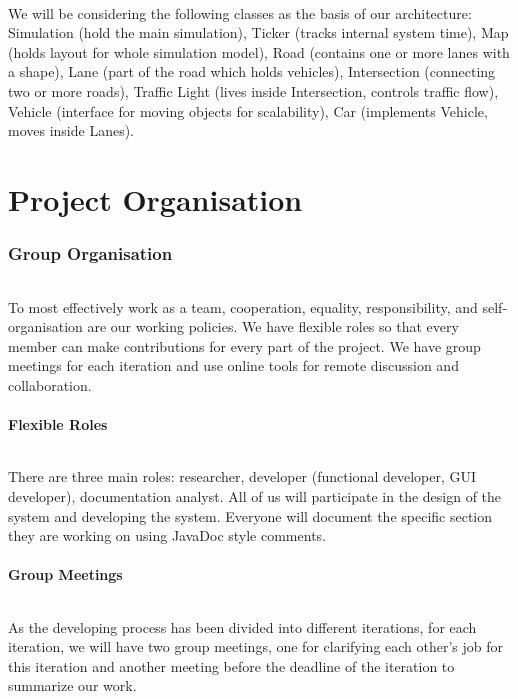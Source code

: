 \documentclass[11pt, a4paper]{article}
\begin{document}
\paragraph{}
We will be considering the following classes as the basis of our architecture: Simulation (hold the main simulation), Ticker (tracks internal system time), Map (holds layout for whole simulation model), Road (contains one or more lanes with a shape), Lane (part of the road which holds vehicles), Intersection (connecting two or more roads), Traffic Light (lives inside Intersection, controls traffic flow), Vehicle (interface for moving objects for scalability), Car (implements Vehicle, moves inside Lanes). 

\part*{Project Organisation}
\section{Group Organisation}
\paragraph{}
To most effectively work as a team, cooperation, equality, responsibility, and self-organisation are our working policies. We have flexible roles so that every member can make contributions for every part of the project. We have group meetings for each iteration and use online tools for remote discussion and collaboration.
\subsection{Flexible Roles}
\paragraph{}
There are three main roles: researcher, developer (functional developer, GUI developer), documentation analyst. All of us will participate in the design of the system and developing the system. Everyone will document the specific section they are working on using JavaDoc style comments.
\subsection{Group Meetings}
\paragraph{}
As the developing process has been divided into different iterations, for each iteration, we will have two group meetings, one for clarifying each other's job for this iteration and another meeting before the deadline of the iteration to summarize our work.
\end{document}
